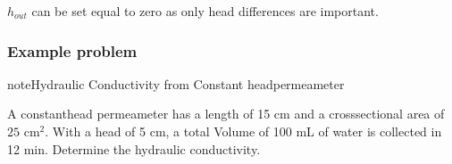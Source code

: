 \documentclass[letterpaper,10pt,english]{sphinxmanual}
\begin{document}
\(h_{out}\) can be set equal to zero as only head differences are important.


\subsubsection{Example problem}
\label{\detokenize{contents/flow/lecture_04/14_darcy_law_K:id3}}
\begin{sphinxadmonition}{note}{Hydraulic Conductivity from Constant head\sphinxhyphen{}permeameter}

A constant\sphinxhyphen{}head permeameter has a length of 15 cm and a cross\sphinxhyphen{}sectional area of \(25\) cm\(^2\). With a head of 5 cm, a total Volume of 100 mL of water is collected in 12 min. Determine the hydraulic conductivity.
\end{sphinxadmonition}
\end{document}
